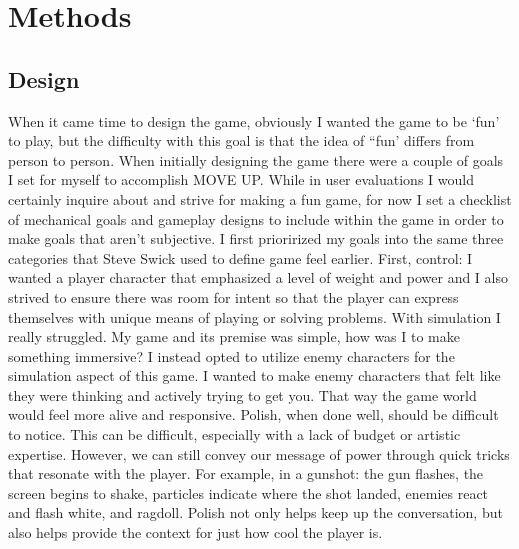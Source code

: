 \documentclass[10pt,twocolumn]{article}
\begin{document}
\section{Methods}

\subsection{Design}
When it came time to design the game, obviously I wanted the game to be ‘fun’ to play, but the difficulty with  this goal is that the idea of “fun’ differs from person to person. When initially designing the game there were a couple of goals I set for myself to accomplish MOVE UP. While in user evaluations I would certainly inquire about and strive for making a fun game, for now I set a checklist of mechanical goals and gameplay designs to include within the game in order to make goals that aren’t subjective. I first priorirized my goals into the same three categories that Steve Swick used to define game feel earlier. First, control: I wanted a player character that emphasized a level of weight and power and I also strived to ensure there was room for intent so that the player can express themselves with unique means of playing or solving problems. With simulation I really struggled. My game and its premise was simple, how was I to make something immersive? I instead opted to utilize enemy characters for the simulation aspect of this game. I wanted to make enemy characters that felt like they were thinking and actively trying to get you. That way the game world would feel more alive and responsive. Polish, when done well, should be difficult to notice. This can be difficult, especially with a lack of budget or artistic expertise. However, we can still convey our message of power through quick tricks that resonate with the player. For example, in a gunshot: the gun flashes, the screen begins to shake, particles indicate where the shot landed, enemies react and flash white, and ragdoll. Polish not only helps keep up the conversation, but also helps provide the context for just how cool the player is.
\end{document}
